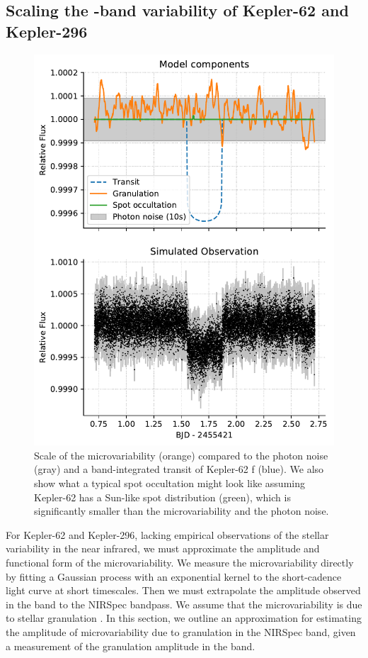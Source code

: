 \subsection{Scaling the \kepler-band variability of Kepler-62 and Kepler-296}

\begin{figure}
\centering
\includegraphics[scale=0.6]{libra/k62f_breakdown.pdf}
\caption{Scale of the microvariability (orange) compared to the photon noise (gray) and a band-integrated transit of Kepler-62 f (blue). We also show what a typical spot occultation might look like assuming Kepler-62 has a Sun-like spot distribution (green), which is significantly smaller than the microvariability and the photon noise.}
\label{fig:k62f}
\end{figure}

For Kepler-62 and Kepler-296, lacking empirical observations of the stellar variability in the near infrared, we must approximate the amplitude and functional form of the microvariability. We measure the microvariability directly by fitting a Gaussian process with an exponential kernel to the \kepler short-cadence light curve at short timescales. Then we must extrapolate the amplitude observed in the \kepler band to the NIRSpec bandpass. We assume that the microvariability is due to stellar granulation \citep{ludwig2002, tremblay2013, Trampedach2017}. In this section, we outline an approximation for estimating the amplitude of microvariability due to granulation in the NIRSpec band, given a measurement of the granulation amplitude in the \kepler band.

